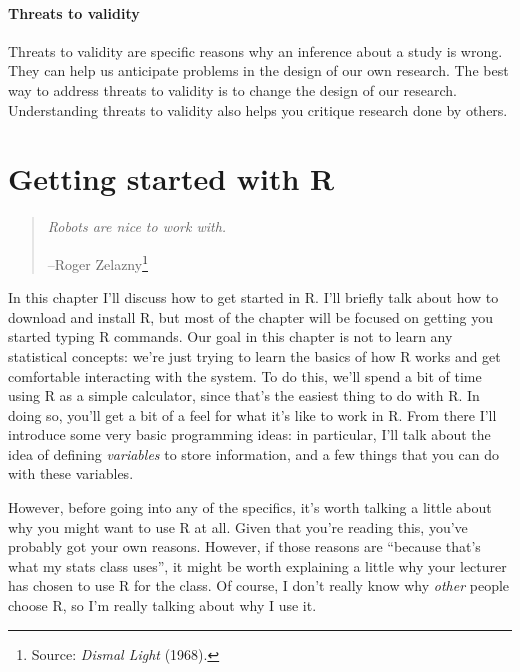 \documentclass[
]{book}
\begin{document}
\hypertarget{threats-to-validity}{%
\subsubsection{Threats to validity}\label{threats-to-validity}}

Threats to validity are specific reasons why an inference about a study is wrong. They can help us anticipate problems in the design of our own research. The best way to address threats to validity is to change the design of our research. Understanding threats to validity also helps you critique research done by others.

\hypertarget{introR}{%
\chapter{Getting started with R}\label{introR}}

\begin{quote}
\emph{Robots are nice to work with.}

--Roger Zelazny\footnote{Source: \emph{Dismal Light} (1968).}
\end{quote}

In this chapter I'll discuss how to get started in R. I'll briefly talk about how to download and install R, but most of the chapter will be focused on getting you started typing R commands. Our goal in this chapter is not to learn any statistical concepts: we're just trying to learn the basics of how R works and get comfortable interacting with the system. To do this, we'll spend a bit of time using R as a simple calculator, since that's the easiest thing to do with R. In doing so, you'll get a bit of a feel for what it's like to work in R. From there I'll introduce some very basic programming ideas: in particular, I'll talk about the idea of defining \emph{variables} to store information, and a few things that you can do with these variables.

However, before going into any of the specifics, it's worth talking a little about why you might want to use R at all. Given that you're reading this, you've probably got your own reasons. However, if those reasons are ``because that's what my stats class uses'', it might be worth explaining a little why your lecturer has chosen to use R for the class. Of course, I don't really know why \emph{other} people choose R, so I'm really talking about why I use it.
\end{document}
